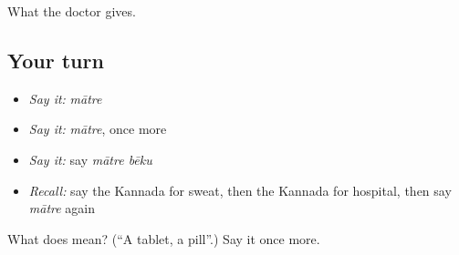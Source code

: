\begin{grammarlens}[title={What you've built}]
What the doctor gives.
\end{grammarlens}

\subsection*{Your turn}
\begin{itemize}
\raggedright
  \item \emph{Say it:} \emph{mātre}
  \item \emph{Say it:} \emph{mātre}, once more
  \item \emph{Say it:} say \emph{mātre bēku}
  \item \emph{Recall:} say the Kannada for sweat, then the Kannada for hospital, then say \emph{mātre} again
\end{itemize}

\begin{tcolorbox}[breakable,colback=teal!4,colframe=teal!35!black,title={Before you move on}]
What does  mean? (\textquotedblleft{}A tablet, a pill\textquotedblright{}.) Say it once more.
\end{tcolorbox}
